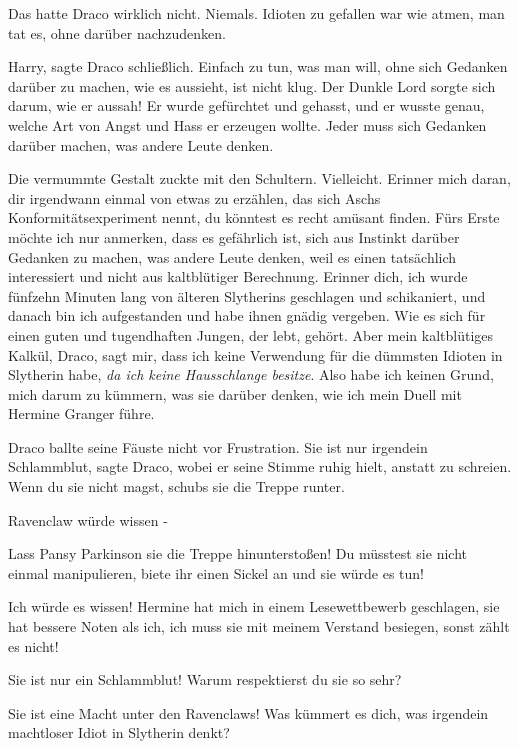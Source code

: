 Das hatte Draco wirklich nicht. Niemals. Idioten zu gefallen war wie atmen, man
tat es, ohne darüber nachzudenken.

\glqq{}Harry\grqq{}, sagte Draco schließlich. \glqq{}Einfach zu tun, was man
will, ohne sich Gedanken darüber zu machen, wie es aussieht, ist nicht klug. Der
Dunkle Lord sorgte sich darum, wie er aussah! Er wurde gefürchtet und gehasst,
und er wusste genau, welche Art von Angst und Hass er erzeugen wollte. Jeder
muss sich Gedanken darüber machen, was andere Leute denken.\grqq{}

Die vermummte Gestalt zuckte mit den Schultern. \glqq{}Vielleicht. Erinner mich
daran, dir irgendwann einmal von etwas zu erzählen, das sich Aschs
Konformitätsexperiment nennt, du könntest es recht amüsant finden. Fürs Erste
möchte ich nur anmerken, dass es gefährlich ist, sich aus Instinkt darüber
Gedanken zu machen, was andere Leute denken, weil es einen tatsächlich
interessiert und nicht aus kaltblütiger Berechnung. Erinner dich, ich wurde
fünfzehn Minuten lang von älteren Slytherins geschlagen und schikaniert, und
danach bin ich aufgestanden und habe ihnen gnädig vergeben. Wie es sich für
einen guten und tugendhaften Jungen, der lebt, gehört. Aber mein kaltblütiges
Kalkül, Draco, sagt mir, dass ich keine Verwendung für die dümmsten Idioten in
Slytherin habe, \emph{da ich keine Hausschlange besitze}. Also habe ich keinen
Grund, mich darum zu kümmern, was sie darüber denken, wie ich mein Duell mit
Hermine Granger führe.\grqq{}

Draco ballte seine Fäuste nicht vor Frustration. \glqq{}Sie ist nur irgendein
Schlammblut\grqq{}, sagte Draco, wobei er seine Stimme ruhig hielt, anstatt zu
schreien. \glqq{}Wenn du sie nicht magst, schubs sie die Treppe runter.\grqq{}

\glqq{}Ravenclaw würde wissen -\grqq{}

\glqq{}Lass Pansy Parkinson sie die Treppe hinunterstoßen! Du müsstest sie nicht
einmal manipulieren, biete ihr einen Sickel an und sie würde es tun!\grqq{}

\glqq{}Ich würde es wissen! Hermine hat mich in einem Lesewettbewerb geschlagen,
sie hat bessere Noten als ich, ich muss sie mit meinem Verstand besiegen, sonst
zählt es nicht!\grqq{}

\glqq{}Sie ist nur ein Schlammblut! Warum respektierst du sie so sehr?\grqq{}

\glqq{}Sie ist eine Macht unter den Ravenclaws! Was kümmert es dich, was
irgendein machtloser Idiot in Slytherin denkt?\grqq{}

